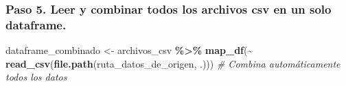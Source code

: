 \documentclass[
]{article}
\newenvironment{Shaded}{\begin{snugshade}}{\end{snugshade}}
\newcommand{\CommentTok}[1]{\textcolor[rgb]{0.56,0.35,0.01}{\textit{#1}}}
\newcommand{\FunctionTok}[1]{\textcolor[rgb]{0.13,0.29,0.53}{\textbf{#1}}}
\newcommand{\NormalTok}[1]{#1}
\newcommand{\OtherTok}[1]{\textcolor[rgb]{0.56,0.35,0.01}{#1}}
\newcommand{\SpecialCharTok}[1]{\textcolor[rgb]{0.81,0.36,0.00}{\textbf{#1}}}
\begin{document}
\subsubsection{\texorpdfstring{\textbf{Paso 5.} Leer y combinar todos
los archivos csv en un solo
dataframe.}{Paso 5. Leer y combinar todos los archivos csv en un solo dataframe.}}\label{paso-5.-leer-y-combinar-todos-los-archivos-csv-en-un-solo-dataframe.}

\begin{Shaded}
\begin{Highlighting}[]
\NormalTok{dataframe\_combinado }\OtherTok{\textless{}{-}}\NormalTok{ archivos\_csv }\SpecialCharTok{\%\textgreater{}\%}
  \FunctionTok{map\_df}\NormalTok{(}\SpecialCharTok{\textasciitilde{}} \FunctionTok{read\_csv}\NormalTok{(}\FunctionTok{file.path}\NormalTok{(ruta\_datos\_de\_origen, .))) }\CommentTok{\# Combina automáticamente todos los datos}
\end{Highlighting}
\end{Shaded}
\end{document}
